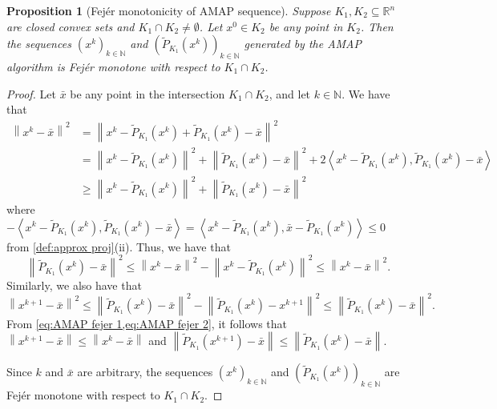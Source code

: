 \documentclass[smallextended,numbook,nospthms]{svjour3}
\theoremstyle{plain}
\newtheorem{proposition}[theorem]{Proposition}
\theoremstyle{definition}
\def\RR{\mathds R}
\def\NN{\mathds N}
\newcommand{\scal}[2]{\left\langle{#1},{#2}  \right\rangle}
\begin{document}
\begin{proposition}[Fejér monotonicity of AMAP sequence]\label{prop:AMAP Fejer}
	Suppose $K_{1},K_{2} \subseteq \RR^{n}$ are closed convex sets and $K_{1} \cap K_{2} \neq \emptyset$. Let $x^{0} \in K_{2}$ be any point in $K_{2}$. Then the sequences $\left(x^{k}\right)_{k \in \NN}$ and $\left(\tilde{P}_{K_{1}}\left(x^{k}\right)\right)_{k \in \NN}$ generated by the AMAP algorithm is Fejér monotone with respect to $K_{1} \cap K_{2}$.
\end{proposition}
\begin{proof}
	Let $\bar{x}$ be any point in the intersection $K_{1} \cap K_{2}$, and let $k \in \NN$. We have that
	\begin{align}
		\left\|x^{k}-\bar{x}\right\|^{2} &=\left\|x^{k}-\tilde{P}_{K_1}(x^k)+\tilde{P}_{K_1}(x^k)-\bar{x}\right\|^{2} \\
		&=\left\|x^{k}-\tilde{P}_{K_1}(x^k)\right\|^{2}+\left\|\tilde{P}_{K_1}(x^k)-\bar{x}\right\|^{2}+2\scal{x^{k}-\tilde{P}_{K_1}(x^k)}{\tilde{P}_{K_1}(x^k)-\bar{x}} \\
		& \geq\left\|x^{k}-\tilde{P}_{K_1}(x^k)\right\|^{2}+\left\|\tilde{P}_{K_1}(x^k)-\bar{x}\right\|^{2}
	\end{align}
	where $-\scal{x^{k}-\tilde{P}_{K_1}(x^k)}{\tilde{P}_{K_1}(x^k)-\bar{x}}=\scal{x^{k}-\tilde{P}_{K_1}(x^k)}{\bar{x}-\tilde{P}_{K_1}(x^k)} \leq 0$ from \cref{def:approx proj}(ii). Thus, we have that
	\begin{equation}\label{eq:AMAP fejer 1}
		\left\|\tilde{P}_{K_{1}}\left(x^{k}\right)-\bar{x}\right\|^{2} \leq \left\|x^{k}-\bar{x}\right\|^{2} - \left\|x^{k}-\tilde{P}_{K_{1}}\left(x^{k}\right)\right\|^{2} \leq \left\|x^{k}-\bar{x}\right\|^{2}.
	\end{equation}
	Similarly, we also have that
	\begin{equation}\label{eq:AMAP fejer 2}
		\left\|x^{k+1}-\bar{x}\right\|^{2} \leq \left\|\tilde{P}_{K_{1}}\left(x^{k}\right)-\bar{x}\right\|^{2} - \left\|\tilde{P}_{K_{1}}\left(x^{k}\right)-x^{k+1}\right\|^{2} \leq \left\|\tilde{P}_{K_{1}}\left(x^{k}\right)-\bar{x}\right\|^{2}.
	\end{equation}
	From \cref{eq:AMAP fejer 1,eq:AMAP fejer 2}, it follows that $\left\|x^{k+1}-\bar{x}\right\| \leq \left\|x^{k}-\bar{x}\right\|$
	and $\left\|\tilde{P}_{K_{1}}\left(x^{k+1}\right)-\bar{x}\right\| \leq \left\|\tilde{P}_{K_{1}}\left(x^{k}\right)-\bar{x}\right\|$.

	Since $k$ and $\bar{x}$ are arbitrary, the sequences $\left(x^{k}\right)_{k \in \NN}$ and $\left(\tilde{P}_{K_{1}}\left(x^{k}\right)\right)_{k \in \NN}$ are Fejér monotone with respect to $K_1 \cap K_2$.
\end{proof}
\end{document}
